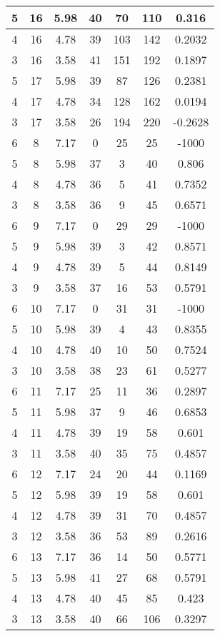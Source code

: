 \documentclass[letterpaper, 12pt]{article}
\begin{document}
\begin{longtable}{|c|c|c|c|c|c|c|}
\hline
5 & 16 & 5.98 & 40 & 70 & 110 & 0.316 \\
\hline
4 & 16 & 4.78 & 39 & 103 & 142 & 0.2032 \\
\hline
3 & 16 & 3.58 & 41 & 151 & 192 & 0.1897 \\
\hline
5 & 17 & 5.98 & 39 & 87 & 126 & 0.2381 \\
\hline
4 & 17 & 4.78 & 34 & 128 & 162 & 0.0194 \\
\hline
3 & 17 & 3.58 & 26 & 194 & 220 & -0.2628 \\
\hline
6 & 8 & 7.17 & 0 & 25 & 25 & -1000 \\
\hline
5 & 8 & 5.98 & 37 & 3 & 40 & 0.806 \\
\hline
4 & 8 & 4.78 & 36 & 5 & 41 & 0.7352 \\
\hline
3 & 8 & 3.58 & 36 & 9 & 45 & 0.6571 \\
\hline
6 & 9 & 7.17 & 0 & 29 & 29 & -1000 \\
\hline
5 & 9 & 5.98 & 39 & 3 & 42 & 0.8571 \\
\hline
4 & 9 & 4.78 & 39 & 5 & 44 & 0.8149 \\
\hline
3 & 9 & 3.58 & 37 & 16 & 53 & 0.5791 \\
\hline
6 & 10 & 7.17 & 0 & 31 & 31 & -1000 \\
\hline
5 & 10 & 5.98 & 39 & 4 & 43 & 0.8355 \\
\hline
4 & 10 & 4.78 & 40 & 10 & 50 & 0.7524 \\
\hline
3 & 10 & 3.58 & 38 & 23 & 61 & 0.5277 \\
\hline
6 & 11 & 7.17 & 25 & 11 & 36 & 0.2897 \\
\hline
5 & 11 & 5.98 & 37 & 9 & 46 & 0.6853 \\
\hline
4 & 11 & 4.78 & 39 & 19 & 58 & 0.601 \\
\hline
3 & 11 & 3.58 & 40 & 35 & 75 & 0.4857 \\
\hline
6 & 12 & 7.17 & 24 & 20 & 44 & 0.1169 \\
\hline
5 & 12 & 5.98 & 39 & 19 & 58 & 0.601 \\
\hline
4 & 12 & 4.78 & 39 & 31 & 70 & 0.4857 \\
\hline
3 & 12 & 3.58 & 36 & 53 & 89 & 0.2616 \\
\hline
6 & 13 & 7.17 & 36 & 14 & 50 & 0.5771 \\
\hline
5 & 13 & 5.98 & 41 & 27 & 68 & 0.5791 \\
\hline
4 & 13 & 4.78 & 40 & 45 & 85 & 0.423 \\
\hline
3 & 13 & 3.58 & 40 & 66 & 106 & 0.3297 \\

\end{longtable}
\end{document}
